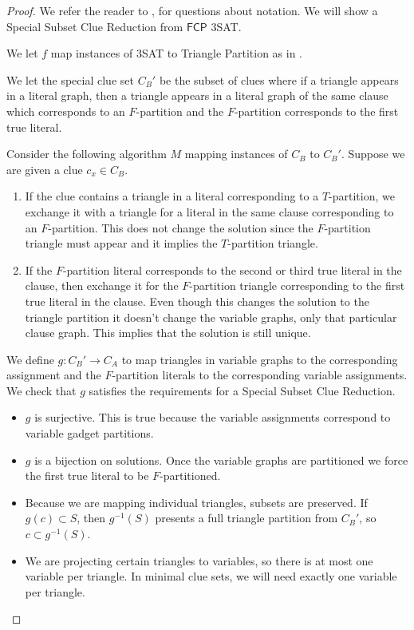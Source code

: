 \documentclass[runningheads,a4paper]{llncs}
\begin{document}
\begin{proof}
We refer the reader to \cite{holyer1981np}, \cite{colbourn1984complexity} for questions about notation. We will show a Special Subset Clue Reduction from $\mathsf{FCP}$ 3SAT. 

We let $f$ map instances of 3SAT to Triangle Partition as in \cite{holyer1981np}.

We let the special clue set $C_B'$ be the subset of clues where if a triangle appears in a literal graph, then a triangle appears in a literal graph of the same clause which corresponds to an $F$-partition and the $F$-partition corresponds to the first true literal.

Consider the following algorithm $M$ mapping instances of $C_B$ to $C_B'$. Suppose we are given a clue $c_x \in C_B$. 
\begin{enumerate}
\item If the clue contains a triangle in a literal corresponding to a $T$-partition, we exchange it with a triangle for a literal in the same clause corresponding to an $F$-partition. This does not change the solution since the $F$-partition triangle must appear and it implies the $T$-partition triangle. 
\item If the $F$-partition literal corresponds to the second or third true literal in the clause, then exchange it for the $F$-partition triangle corresponding to the first true literal in the clause. Even though this changes the solution to the triangle partition it doesn't change the variable graphs, only that particular clause graph. This implies that the solution is still unique.
\end{enumerate}

We define $g: C_B' \rightarrow C_A$ to map triangles in variable graphs to the corresponding assignment and the $F$-partition literals to the corresponding variable assignments. We check that $g$ satisfies the requirements for a Special Subset Clue Reduction.
\begin{itemize}
\item $g$ is surjective. This is true because the variable assignments correspond to variable gadget partitions.
\item $g$ is a bijection on solutions. Once the variable graphs are partitioned we force the first true literal to be $F$-partitioned. 
\item Because we are mapping individual triangles, subsets are preserved. If $g(c) \subset S$, then $g^{-1}(S)$ presents a full triangle partition from $C_B'$, so $c \subset g^{-1}(S)$. 
\item We are projecting certain triangles to variables, so there is at most one variable per triangle. In minimal clue sets, we will need exactly one variable per triangle.
\end{itemize}
\end{proof}
\end{document}
